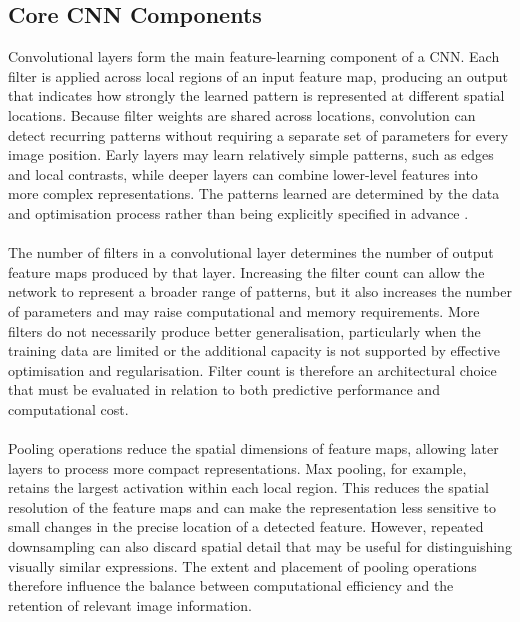 \documentclass[12pt, a4paper]{report}
\let\oldsubsection\subsection
\renewcommand{\subsection}{%
    \Needspace{6\baselineskip}%
    \oldsubsection
}
\begin{document}
			\subsection{Core CNN Components}
				
				Convolutional layers form the main feature-learning component of a CNN. Each filter is applied across local regions of an input feature map, producing an output that indicates how strongly the learned pattern is represented at different spatial locations. Because filter weights are shared across locations, convolution can detect recurring patterns without requiring a separate set of parameters for every image position. Early layers may learn relatively simple patterns, such as edges and local contrasts, while deeper layers can combine lower-level features into more complex representations. The patterns learned are determined by the data and optimisation process rather than being explicitly specified in advance \cite{LeCun1998Gradient, Sutar2023DeepFER}.\\\\
				The number of filters in a convolutional layer determines the number of output feature maps produced by that layer. Increasing the filter count can allow the network to represent a broader range of patterns, but it also increases the number of parameters and may raise computational and memory requirements. More filters do not necessarily produce better generalisation, particularly when the training data are limited or the additional capacity is not supported by effective optimisation and regularisation. Filter count is therefore an architectural choice that must be evaluated in relation to both predictive performance and computational cost.\\\\
				Pooling operations reduce the spatial dimensions of feature maps, allowing later layers to process more compact representations. Max pooling, for example, retains the largest activation within each local region. This reduces the spatial resolution of the feature maps and can make the representation less sensitive to small changes in the precise location of a detected feature. However, repeated downsampling can also discard spatial detail that may be useful for distinguishing visually similar expressions. The extent and placement of pooling operations therefore influence the balance between computational efficiency and the retention of relevant image information.\\\\\\
\end{document}
